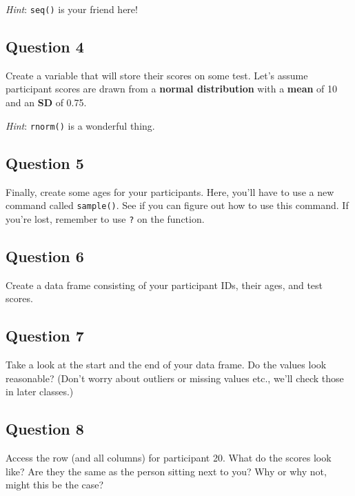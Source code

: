 \documentclass[
]{book}
\begin{document}
\emph{Hint}: \texttt{seq()} is your friend here!

\hypertarget{question-4}{%
\subsection{Question 4}\label{question-4}}

Create a variable that will store their scores on some test. Let's assume participant scores are drawn from a \textbf{normal distribution} with a \textbf{mean} of 10 and an \textbf{SD} of 0.75.

\emph{Hint}: \texttt{rnorm()} is a wonderful thing.

\hypertarget{question-5}{%
\subsection{Question 5}\label{question-5}}

Finally, create some ages for your participants. Here, you'll have to use a new command called \texttt{sample()}. See if you can figure out how to use this command. If you're lost, remember to use \texttt{?} on the function.

\hypertarget{question-6}{%
\subsection{Question 6}\label{question-6}}

Create a data frame consisting of your participant IDs, their ages, and test scores.

\hypertarget{question-7}{%
\subsection{Question 7}\label{question-7}}

Take a look at the start and the end of your data frame. Do the values look reasonable? (Don't worry about outliers or missing values etc., we'll check those in later classes.)

\hypertarget{question-8}{%
\subsection{Question 8}\label{question-8}}

Access the row (and all columns) for participant 20. What do the scores look like? Are they the same as the person sitting next to you? Why or why not, might this be the case?
\end{document}
